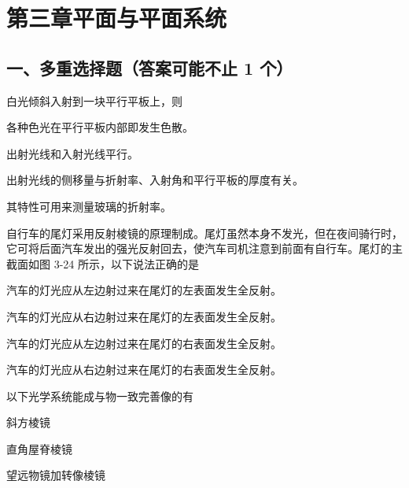 \documentclass[standard, analysis, notocnum]{ExBook}
\newcommand{\answerarea}[1][8cm]{%
  \par\vspace{2mm}%
  \noindent{\color{themeColor!35}\rule{\linewidth}{0.4pt}}\par
  \noindent\begin{minipage}[t][#1][t]{\linewidth}\vspace{0pt}\end{minipage}\par
  \noindent{\color{themeColor!35}\rule{\linewidth}{0.4pt}}\par
}
\begin{document}
\section{第三章\quad 平面与平面系统}
\subsection{一、多重选择题（答案可能不止 1 个）}
\begin{qitems}
\begin{bbox}
\qitem 白光倾斜入射到一块平行平板上，则
\par\noindent\hspace{2em}各种色光在平行平板内部即发生色散。
\par\noindent\hspace{2em}出射光线和入射光线平行。
\par\noindent\hspace{2em}出射光线的侧移量与折射率、入射角和平行平板的厚度有关。
\par\noindent\hspace{2em}其特性可用来测量玻璃的折射率。
\answerarea[3.5cm]
\end{bbox}
\begin{bbox}
\qitem 自行车的尾灯采用反射棱镜的原理制成。尾灯虽然本身不发光，但在夜间骑行时，它可将后面汽车发出的强光反射回去，使汽车司机注意到前面有自行车。尾灯的主截面如图 3-24 所示，以下说法正确的是
\par\noindent\hspace{2em}汽车的灯光应从左边射过来在尾灯的左表面发生全反射。
\par\noindent\hspace{2em}汽车的灯光应从右边射过来在尾灯的左表面发生全反射。
\par\noindent\hspace{2em}汽车的灯光应从左边射过来在尾灯的右表面发生全反射。
\par\noindent\hspace{2em}汽车的灯光应从右边射过来在尾灯的右表面发生全反射。
\answerarea[3.5cm]
\end{bbox}
\begin{bbox}
\qitem 以下光学系统能成与物一致完善像的有
\par\noindent\hspace{2em}斜方棱镜
\par\noindent\hspace{2em}直角屋脊棱镜
\par\noindent\hspace{2em}望远物镜加转像棱镜

\end{bbox}
\end{qitems}
\end{document}
